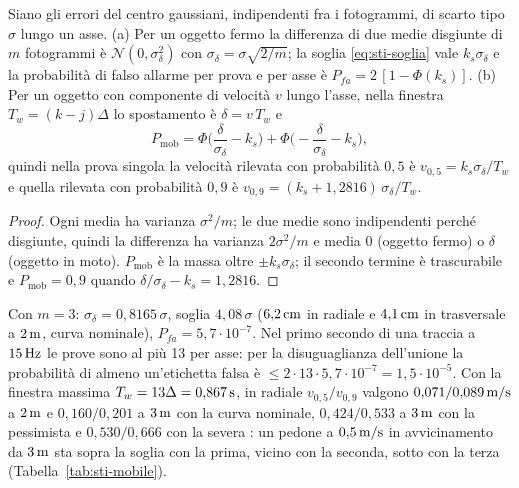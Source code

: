 \begin{proposizione}\label{prop:sti-mobile}
Siano gli errori del centro gaussiani, indipendenti fra i fotogrammi, di scarto tipo $\sigma$ lungo un asse. (a) Per un oggetto fermo la differenza di due medie disgiunte di $m$ fotogrammi è $\mathcal N(0,\sigma_\delta^2)$ con $\sigma_\delta=\sigma\sqrt{2/m}$; la soglia \eqref{eq:sti-soglia} vale $k_s\sigma_\delta$ e la probabilità di falso allarme per prova e per asse è $P_{fa}=2\,[1-\Phi(k_s)]$. (b) Per un oggetto con componente di velocità $v$ lungo l'asse, nella finestra $T_w=(k-j)\Delta$ lo spostamento è $\delta=v\,T_w$ e
\[P_{\mathrm{mob}}=\Phi\!\Big(\frac{\delta}{\sigma_\delta}-k_s\Big)+\Phi\!\Big(-\frac{\delta}{\sigma_\delta}-k_s\Big),\]
quindi nella prova singola la velocità rilevata con probabilità $0{,}5$ è $v_{0,5}=k_s\sigma_\delta/T_w$ e quella rilevata con probabilità $0{,}9$ è $v_{0,9}=(k_s+1{,}2816)\,\sigma_\delta/T_w$. 
\end{proposizione}
\begin{proof}
Ogni media ha varianza $\sigma^2/m$; le due medie sono indipendenti perché disgiunte, quindi la differenza ha varianza $2\sigma^2/m$ e media $0$ (oggetto fermo) o $\delta$ (oggetto in moto). $P_{\mathrm{mob}}$ è la massa oltre $\pm k_s\sigma_\delta$; il secondo termine è trascurabile e $P_{\mathrm{mob}}=0{,}9$ quando $\delta/\sigma_\delta-k_s=1{,}2816$.
\end{proof}
Con $m=3$: $\sigma_\delta=0{,}8165\,\sigma$, soglia $4{,}08\,\sigma$ ($6{,}2\,\mathrm{cm}$ in radiale e $4{,}1\,\mathrm{cm}$ in trasversale a $2\,\mathrm{m}$, curva nominale), $P_{fa}=5{,}7\cdot10^{-7}$. Nel primo secondo di una traccia a $15\,\mathrm{Hz}$ le prove sono al più 13 per asse: per la disuguaglianza dell'unione la probabilità di almeno un'etichetta falsa è $\le2\cdot13\cdot5{,}7\cdot10^{-7}=1{,}5\cdot10^{-5}$. Con la finestra massima $T_w=13\Delta=0{,}867\,\mathrm{s}$, in radiale $v_{0,5}/v_{0,9}$ valgono $0{,}071/0{,}089\,\mathrm{m/s}$ a $2\,\mathrm{m}$ e $0{,}160/0{,}201$ a $3\,\mathrm{m}$ con la curva nominale, $0{,}424/0{,}533$ a $3\,\mathrm{m}$ con la pessimista e $0{,}530/0{,}666$ con la severa : un pedone a $0{,}5\,\mathrm{m/s}$ in avvicinamento da $3\,\mathrm{m}$ sta sopra la soglia con la prima, vicino con la seconda, sotto con la terza (Tabella~\ref{tab:sti-mobile}).

